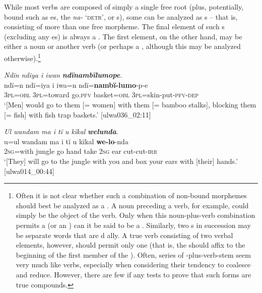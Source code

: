 While most verbs are composed of simply a single free root (plus, potentially,  bound  such as  es, the   \textit{na-} ‘\textsc{detr}’, or  s), some can be analyzed as s -- that is, consisting of more than one free morpheme. The final element of such s (excluding any es) is always a . The first element, on the other hand, may be either a noun  or another verb  (or perhaps a , although this may be analyzed otherwise).\footnote{Often it is not clear whether such a combination of non-bound morphemes should best be analyzed as a . A noun preceding a verb, for example, could simply be the object of the verb. Only when this noun-plus-verb combination permits a  (or an ) can it be said to be a . Similarly, two s in succession may be separate words that are d ally. A true  verb consisting of two verbal elements, however, should permit only one  (that is, the  should affix to the beginning of the first member of the ). Often, series of -plus-verb-stem seem very much like  verbs, especially when considering their  tendency to coalesce and reduce. However, there are few if any  tests to prove that such forms are true compounds.}

\ea%
    \label{ex:verbs:96}

          \textit{Ndïn ndiya i iwan} \textbf{\textit{ndïnambïlumope}}.\\
\gll ndï=n    ndï=iya     i     iwa=n ndï=\textbf{nambï-lumo}{}-p-e\\
    3\textsc{pl=obl}  3\textsc{pl}=toward  go.\textsc{pfv}  basket=\textsc{obl}    3\textsc{pl}=skin-put-\textsc{pfv-dep}\\


\glt `[Men] would go to them [= women] with them [= bamboo stalks], blocking them [= fish] with fish trap baskets.’ [ulwa036\_02:11]
\z

\newpage

\ea%
    \label{ex:verbs:97}

          \textit{Ul wandam ma i tï u kïkal} \textbf{\textit{welunda}}.\\
\gll u=ul     wandam  ma  i     tï     u    kïkal \textbf{we-lo}{}-nda\\
    2\textsc{sg}=with  jungle     go  hand  take  2\textsc{sg}  ear    cut-cut-\textsc{irr}\\
\glt `[They] will go to the jungle with you and box your ears with [their] hands.’ [ulwa014\_00:44]
\z

